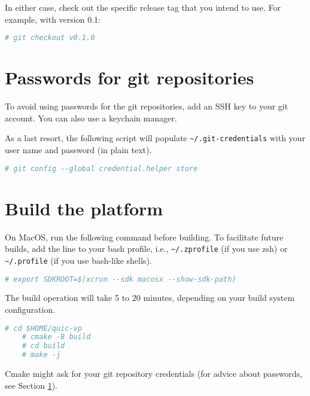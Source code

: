 In either case, check out the specific release tag that you intend to use. For example, with version 0.1:

\small
\begin{lstlisting}[language=bash]
    # git checkout v0.1.0
\end{lstlisting}
\normalsize


\section{Passwords for git repositories}
\label{sec:passwords-git-repos}

To avoid using passwords for the git repositories, add an SSH key to your git account. You can also use a keychain manager.

As a last resort, the following script will populate {\small{\lstinline!~/.git-credentials!}} with your user name and password (in plain text).

\small
\begin{lstlisting}[language=bash]
    # git config --global credential.helper store
\end{lstlisting}
\normalsize


\section{Build the platform}

\note On MacOS, run the following command before building. To facilitate
future builds, add the line to your bash profile, i.e.,
{\small{\lstinline!~/.zprofile!}} (if you use zsh) or
{\small{\lstinline!~/.profile!}} (if you use bash-like shells).

\small
\begin{lstlisting}[language=bash]
    # export SDKROOT=$(xcrun --sdk macosx --show-sdk-path)
\end{lstlisting}
\normalsize



The build operation will take 5 to 20 minutes, depending on your build system configuration.

\small
\begin{lstlisting}[language=bash]
    # cd $HOME/quic-vp
    # cmake -B build
    # cd build
    # make -j
\end{lstlisting}
\normalsize

Cmake might ask for your git repository credentials (for advice about passwords, see Section \ref{sec:passwords-git-repos}). \vspace{6pt}

